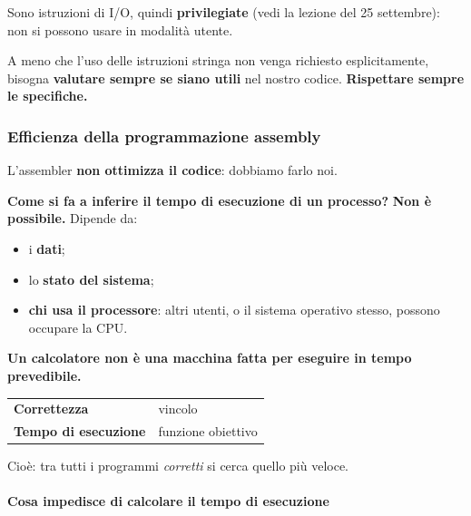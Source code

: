 \documentclass[11pt,a4paper]{article}
\begin{document}
\begin{integrazione}
Sono istruzioni di I/O, quindi \textbf{privilegiate} (vedi la lezione del 25 settembre): non si possono usare in modalità utente.
\end{integrazione}

\begin{nota}
A meno che l'uso delle istruzioni stringa non venga richiesto esplicitamente, bisogna \textbf{valutare sempre se siano utili} nel nostro codice. \textbf{Rispettare sempre le specifiche.}
\end{nota}

\subsubsection*{Efficienza della programmazione assembly}

L'assembler \textbf{non ottimizza il codice}: dobbiamo farlo noi.

\textbf{Come si fa a inferire il tempo di esecuzione di un processo?} \textbf{Non è possibile.} Dipende da:
\begin{itemize}[leftmargin=*]
  \item i \textbf{dati};
  \item lo \textbf{stato del sistema};
  \item \textbf{chi usa il processore}: altri utenti, o il sistema operativo stesso, possono occupare la CPU.
\end{itemize}

\textbf{Un calcolatore non è una macchina fatta per eseguire in tempo prevedibile.}

\begin{center}
\begin{tabular}{l l}
\textbf{Correttezza} & vincolo \\
\textbf{Tempo di esecuzione} & funzione obiettivo \\
\end{tabular}
\end{center}

Cioè: tra tutti i programmi \emph{corretti} si cerca quello più veloce.

\paragraph*{Cosa impedisce di calcolare il tempo di esecuzione}
\end{document}
